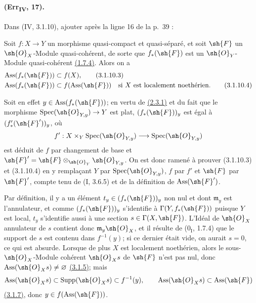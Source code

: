 \paragraph{(Err\textsubscript{IV}, 17).}
Dans (IV, 3.1.10), ajouter après la ligne 16 de la p.~39 :

\begin{remark}[3.1.10.2]
\label{IV.3.1.10.2}
Soit $f:X\to Y$ un morphisme quasi-compact et quasi-séparé, et soit
$\sh{F}$ un $\sh{O}_X$-Module quasi-cohérent, de sorte que
$f_*(\sh{F})$ est un $\sh{O}_Y$-Module quasi-cohérent
{\hyperref[canon-index.ega4.c04.statement.1-7-4]{(1.7.4)}}. Alors on a
\begin{align}
 \operatorname{Ass}(f_*(\sh{F}))&\subset f(X),
 \label{IV.3.1.10.3}\tag{3.1.10.3}\\
 \operatorname{Ass}(f_*(\sh{F}))&\subset f(\operatorname{Ass}(\sh{F}))
 \quad\text{si $X$ est localement noethérien}.
 \label{IV.3.1.10.4}\tag{3.1.10.4}
\end{align}

Soit en effet $y\in\operatorname{Ass}(f_*(\sh{F}))$; en vertu de
{\hyperref[canon-index.ega4.c04.lem.2-3-1]{(2.3.1)}} et du fait que le morphisme
$\operatorname{Spec}(\sh{O}_{Y,y})\to Y$ est plat,
$(f_*(\sh{F}))_y$ est égal à $(f'_*(\sh{F}'))_y$, où
\[
 f':X\times_Y\operatorname{Spec}(\sh{O}_{Y,y})
 \longrightarrow\operatorname{Spec}(\sh{O}_{Y,y})
\]
est déduit de $f$ par changement de base et
$\sh{F}'=\sh{F}\otimes_{\sh{O}_Y}\sh{O}_{Y,y}$. On est donc ramené à
prouver (3.1.10.3) et (3.1.10.4) en y remplaçant $Y$ par
$\operatorname{Spec}(\sh{O}_{Y,y})$, $f$ par $f'$ et $\sh{F}$ par
$\sh{F}'$, compte tenu de (I, 3.6.5) et de la définition de
$\operatorname{Ass}(\sh{F}')$.

Par définition, il y a un élément
$t_y\in(f_*(\sh{F}))_y$ non nul et dont $\mathfrak m_y$ est
l'annulateur, et comme $(f_*(\sh{F}))_y$ s'identifie à
$\Gamma(Y,f_*(\sh{F}))$ puisque $Y$ est local, $t_y$ s'identifie aussi
à une section $s\in\Gamma(X,\sh{F})$. L'Idéal de $\sh{O}_X$ annulateur
de $s$ contient donc $\mathfrak m_y\sh{O}_X$, et il résulte de
($0_{\mathrm I}$, 1.7.4) que le support de $s$ est contenu dans
$f^{-1}(y)$; si ce dernier était vide, on aurait $s=0$, ce qui est
absurde. Lorsque de plus $X$ est localement noethérien, alors le
sous-$\sh{O}_X$-Module cohérent $\sh{O}_Xs$ de $\sh{F}$ n'est pas nul,
donc $\operatorname{Ass}(\sh{O}_Xs)\neq\varnothing$
{\hyperref[canon-index.ega4.c04.cor.3-1-5]{(3.1.5)}}; mais
\[
 \operatorname{Ass}(\sh{O}_Xs)\subset
 \operatorname{Supp}(\sh{O}_Xs)\subset f^{-1}(y),\qquad
 \operatorname{Ass}(\sh{O}_Xs)\subset\operatorname{Ass}(\sh{F})
\]
{\hyperref[canon-index.ega4.c04.prop.3-1-7]{(3.1.7)}}, donc
$y\in f(\operatorname{Ass}(\sh{F}))$.
\end{remark}

